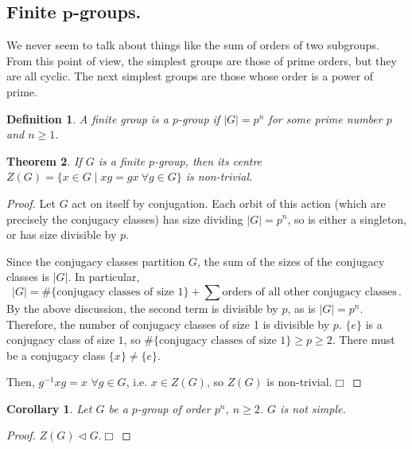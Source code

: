 \documentclass{article}
\theoremstyle{plain}\theoremheaderfont{\normalfont\itshape}\theorembodyfont{\rmfamily}\theoremseparator{.}\newtheorem*{rem}{Remark}\newtheorem*{ex}{Example}\newtheorem*{proof}{Proof}\newtheorem*{altp}{Alternative proof}\newtheorem*{nonex}{Non-Example}
\theoremstyle{plain}\theoremheaderfont{\normalfont\bfseries}\theorembodyfont{\rmfamily}\theoremseparator{.}\newtheorem{thm}{Theorem}[section]\newtheorem{lem}[thm]{Lemma}\newtheorem{prop}[thm]{Proposition}\newtheorem*{cor}{Corollary}\newtheorem{defn}[thm]{Definition}\newtheorem{clm}[thm]{Claim}\newtheorem{clminproof}{Claim}\newtheorem*{notn}{Notation}\newtheorem*{exer}{Exercise}\newtheorem*{lemnn}{Lemma}
\theoremstyle{break}\theoremheaderfont{\normalfont\itshape}\theorembodyfont{\rmfamily}\theoremseparator{.\medskip}\newtheorem*{proofskip}{Proof}\newtheorem*{exs}{Examples}\newtheorem*{rems}{Remarks}\newtheorem*{obs}{Observations}
\theoremstyle{break}\theoremheaderfont{\normalfont\bfseries}\theorembodyfont{\rmfamily}\theoremseparator{.\medskip}\newtheorem{lemskip}[thm]{Lemma}\newtheorem{defnskip}[thm]{Definition}\newtheorem{propskip}[thm]{Proposition}\newtheorem{thmskip}[thm]{Theorem}
\numberwithin{equation}{section}
\newcommand{\qed}{\hfill\ensuremath{\Box}}
\newcommand{\abs}[1]{\left|#1\right|}
\begin{document}
    \subsection{Finite \texorpdfstring{\(\bm{p}\)}{p}-groups.}
    We never seem to talk about things like the sum of orders of two subgroups. From this point of view, the simplest groups are those of prime orders, but they are all cyclic. The next simplest groups are those whose order is a power of prime.
    \begin{defn}
        A finite group is a \(p\)-group if \(\abs{G}=p^n\) for some prime number \(p\) and \(n\ge 1\).
    \end{defn}
    \begin{thm}
        If \(G\) is a finite \(p\)-group, then its centre \(Z(G)=\{x\in G\mid xg=gx \ \forall g\in G\}\) is non-trivial.
    \end{thm}
    \begin{proof}
        Let \(G\) act on itself by conjugation. Each orbit of this action (which are precisely the conjugacy classes) has size dividing \(\abs{G}=p^n\), so is either a singleton, or has size divisible by \(p\).

        Since the conjugacy classes partition \(G\), the sum of the sizes of the conjugacy classes is \(\abs{G}\). In particular,
        \[\abs{G}=\#\{\text{conjugacy classes of size }1\}+\sum\text{orders of all other conjugacy classes}\,.\]
        By the above discussion, the second term is divisible by \(p\), as is \(\abs{G}=p^n\). Therefore, the number of conjugacy classes of size 1 is divisible by \(p\). \(\{e\}\) is a conjugacy class of size \(1\), so \(\#\{\text{conjugacy classes of size }1\}\ge p\ge 2\). There must be a conjugacy class \(\{x\}\ne\{e\}\).

        Then, \(g^{-1}xg=x\) \(\forall g\in G\), i.e. \(x\in Z(G)\), so \(Z(G)\) is non-trivial.\qed
    \end{proof}
    \begin{cor}
        Let \(G\) be a \(p\)-group of order \(p^n\), \(n\ge 2\). \(G\) is not simple.
    \end{cor}
    \begin{proof}
        \(Z(G)\lhd G\).\qed
    \end{proof}
\end{document}
